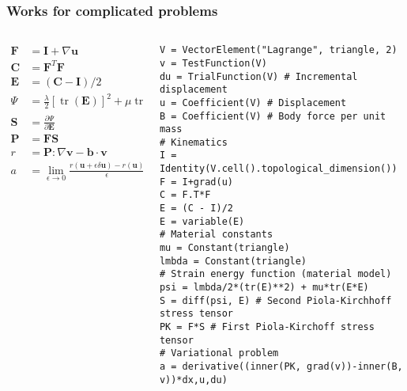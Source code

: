 \documentclass[presentation]{beamer}
\DeclareMathOperator{\tr}{tr}
\begin{document}
\begin{frame}[fragile]
  \frametitle{Works for complicated problems}
  \begin{columns}
    \begin{column}{0.4\textwidth}
      \begin{align*}
        \mathbf{F} &= \mathbf{I} + \nabla \mathbf{u}\\
        \mathbf{C} &= \mathbf{F}^T \mathbf{F}\\
        \mathbf{E} &= (\mathbf{C} - \mathbf{I}) / 2\\
        \Psi &= \frac{\lambda}{2}[\tr(\mathbf{E})]^2 + \mu \tr(\mathbf{E}^2)\\
        \mathbf{S} &= \frac{\partial \Psi}{\partial \mathbf{E}}\\
        \mathbf{P} &= \mathbf{F} \mathbf{S}\\
        r &= \mathbf{P} : \nabla \mathbf{v} - \mathbf{b} \cdot \mathbf{v}\\
        a &= \lim_{\epsilon \to 0} \frac{r(\mathbf{u} + \epsilon \delta \mathbf{u}) - r(\mathbf{u})}{\epsilon}
      \end{align*}
    \end{column}
    \begin{column}{0.6\textwidth}
\begin{verbatim}
V = VectorElement("Lagrange", triangle, 2)
v = TestFunction(V)
du = TrialFunction(V) # Incremental displacement
u = Coefficient(V) # Displacement
B = Coefficient(V) # Body force per unit mass
# Kinematics
I = Identity(V.cell().topological_dimension())
F = I+grad(u)
C = F.T*F
E = (C - I)/2
E = variable(E)
# Material constants
mu = Constant(triangle)
lmbda = Constant(triangle)
# Strain energy function (material model)
psi = lmbda/2*(tr(E)**2) + mu*tr(E*E)
S = diff(psi, E) # Second Piola-Kirchhoff stress tensor
PK = F*S # First Piola-Kirchoff stress tensor
# Variational problem
a = derivative((inner(PK, grad(v))-inner(B, v))*dx,u,du)
\end{verbatim}
    \end{column}
  \end{columns}
\end{frame}
\bgroup
{}
\end{document}
